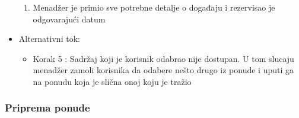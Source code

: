 \documentclass[a4paper]{article}
\begin{document}
\begin{itemize}
\begin{enumerate}
		    \item Menadžer je primio sve potrebne detalje o događaju i rezervisao je odgovarajući datum
        \end{enumerate}
    \item Alternativni tok:
        \begin{itemize}
            \item Korak 5 : Sadržaj koji je korisnik odabrao nije dostupan. U tom slucaju menadžer zamoli korisnika da odabere nešto drugo iz ponude i uputi ga na ponudu koja je slična onoj koju je tražio
        \end{itemize}
\end{itemize}

\subsubsection{Priprema ponude}
\end{document}
